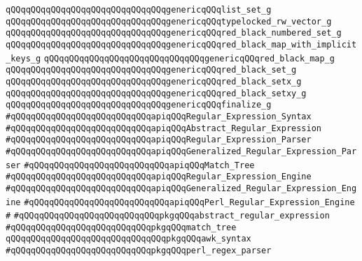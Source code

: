\verb|qQQqqQQqqQQqqQQqqQQqqQQqqQQqqQQqgenericqQQqlist_set_g|\newline
\verb|qQQqqQQqqQQqqQQqqQQqqQQqqQQqqQQqgenericqQQqtypelocked_rw_vector_g|\newline
\verb|qQQqqQQqqQQqqQQqqQQqqQQqqQQqqQQqgenericqQQqred_black_numbered_set_g|\newline
\verb|qQQqqQQqqQQqqQQqqQQqqQQqqQQqqQQqgenericqQQqred_black_map_with_implicit_keys_g|\newline
\verb|qQQqqQQqqQQqqQQqqQQqqQQqqQQqqQQqgenericqQQqred_black_map_g|\newline
\verb|qQQqqQQqqQQqqQQqqQQqqQQqqQQqqQQqgenericqQQqred_black_set_g|\newline
\verb|qQQqqQQqqQQqqQQqqQQqqQQqqQQqqQQqgenericqQQqred_black_setx_g|\newline
\verb|qQQqqQQqqQQqqQQqqQQqqQQqqQQqqQQqgenericqQQqred_black_setxy_g|\newline
\verb|qQQqqQQqqQQqqQQqqQQqqQQqqQQqqQQqgenericqQQqfinalize_g|\newline
\newline
\newline
\newline
\newline
\verb|#qQQqqQQqqQQqqQQqqQQqqQQqqQQqapiqQQqRegular_Expression_Syntax|\newline
\verb|#qQQqqQQqqQQqqQQqqQQqqQQqqQQqapiqQQqAbstract_Regular_Expression|\newline
\verb|#qQQqqQQqqQQqqQQqqQQqqQQqqQQqapiqQQqRegular_Expression_Parser|\newline
\verb|#qQQqqQQqqQQqqQQqqQQqqQQqqQQqapiqQQqGeneralized_Regular_Expression_Parser|\newline
\verb|#qQQqqQQqqQQqqQQqqQQqqQQqqQQqapiqQQqMatch_Tree|\newline
\verb|#qQQqqQQqqQQqqQQqqQQqqQQqqQQqapiqQQqRegular_Expression_Engine|\newline
\verb|#qQQqqQQqqQQqqQQqqQQqqQQqqQQqapiqQQqGeneralized_Regular_Expression_Engine|\newline
\verb|#qQQqqQQqqQQqqQQqqQQqqQQqqQQqapiqQQqPerl_Regular_Expression_Engine|\newline
\verb|#|\newline
\verb|#qQQqqQQqqQQqqQQqqQQqqQQqqQQqpkgqQQqabstract_regular_expression|\newline
\verb|#qQQqqQQqqQQqqQQqqQQqqQQqqQQqpkgqQQqmatch_tree|\newline
\verb|qQQqqQQqqQQqqQQqqQQqqQQqqQQqqQQqpkgqQQqawk_syntax|\newline
\verb|#qQQqqQQqqQQqqQQqqQQqqQQqqQQqpkgqQQqperl_regex_parser|\newline

